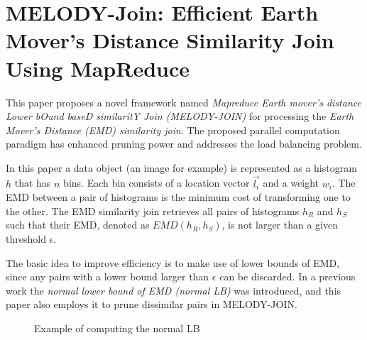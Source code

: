 \documentclass[paper=a4, fontsize=18pt]{article} %
\numberwithin{equation}{section} %
\numberwithin{figure}{section} %
\numberwithin{table}{section} %
\begin{document}
\section{MELODY-Join: Efficient Earth Mover's Distance Similarity Join Using MapReduce \cite{HZBC14}}

This paper proposes a novel framework named \emph{Mapreduce Earth mover's distance Lower bOund baseD similaritY Join (MELODY-JOIN)} for processing the \emph{Earth Mover's Distance (EMD) similarity join}. The proposed parallel computation paradigm has enhanced pruning power and addresses the load balancing problem.

In this paper a data object (an image for example) is represented as a histogram $h$ that has $n$ bins. Each bin consists of a location vector $\vec{l_i}$ and a weight $w_i$. The EMD between a pair of histograms is the minimum cost of transforming one to the other. The EMD similarity join retrieves all pairs of histograms $h_R$ and $h_S$ such that their EMD, denoted as $EMD(h_R, h_S)$, is not larger than a given threshold $\epsilon$.

The basic idea to improve efficiency is to make use of lower bounds of EMD, since any pairs with a lower bound larger than $\epsilon$ can be discarded. In a previous work the \emph{normal lower bound of EMD (normal LB)} \cite{RS11} was introduced, and this paper also employs it to prune dissimilar pairs in MELODY-JOIN.

\begin{figure}[h]
  \centering
  \caption{Example of computing the normal LB}\label{fig:melody}
\end{figure}
\end{document}
